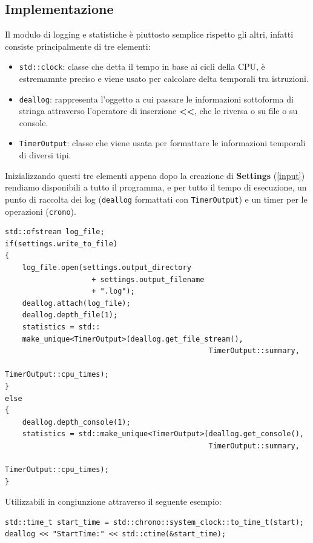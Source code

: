         \subsection{Implementazione}
        Il modulo di logging e statistiche è piuttosto semplice rispetto gli altri, infatti consiste principalmente di tre elementi:
        \begin{itemize}
            \item \texttt{std::clock}: classe che detta il tempo in base ai cicli della CPU, è estremamnte preciso e viene usato per calcolare delta temporali tra istruzioni.
            \item \texttt{deallog}: rappresenta l'oggetto a cui passare le informazioni sottoforma di stringa attraverso l'operatore di inserzione \textbf{<<}, che le riversa o su file o su console.
            \item \texttt{TimerOutput}: classe che viene usata per formattare le informazioni temporali di diversi tipi.
        \end{itemize}
        Inizializzando questi tre elementi appena dopo la creazione di \textbf{Settings} (\ref*{input}) rendiamo disponibili a tutto il programma, e per tutto il tempo di esecuzione,
        un punto di raccolta dei log (\texttt{deallog} formattati con \texttt{TimerOutput}) e un timer per le operazioni (\texttt{crono}).

        \begin{verbatim}
std::ofstream log_file;
if(settings.write_to_file)
{
    log_file.open(settings.output_directory 
                    + settings.output_filename 
                    + ".log");
    deallog.attach(log_file);
    deallog.depth_file(1);
    statistics = std::
    make_unique<TimerOutput>(deallog.get_file_stream(),
                                               TimerOutput::summary,
                                               TimerOutput::cpu_times);
}
else
{
    deallog.depth_console(1);
    statistics = std::make_unique<TimerOutput>(deallog.get_console(),
                                               TimerOutput::summary,
                                               TimerOutput::cpu_times);
}
        \end{verbatim}
        Utilizzabili in congiunzione attraverso il seguente esempio:
        \begin{verbatim}
std::time_t start_time = std::chrono::system_clock::to_time_t(start);
deallog << "StartTime:" << std::ctime(&start_time);
        \end{verbatim}


